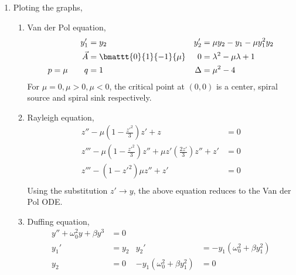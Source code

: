 \begin{enumerate}
    \item Ploting the graphs,
          \begin{enumerate}
              \item Van der Pol equation,
                    \begin{align}
                        y_1'             & = y_2                             &
                        y_2'             & = \mu y_2 - y_1  -\mu y_1^{2} y_2   \\
                        \vec{A}          & = \bmattt{0}{1}{-1}{\mu}          &
                        0                & = \lambda^{2} - \mu\lambda + 1      \\
                        p = \mu \qquad q & = 1                               &
                        \Delta           & = \mu^{2} - 4
                    \end{align}
                    For $ \mu = 0, \mu > 0, \mu< 0 $, the critical point at $ (0, 0) $
                    is a center, spiral source and spiral sink respectively.
              \item Rayleigh equation,
                    \begin{align}
                        z'' - \mu \left( 1 - \frac{z'^{2}}{3} \right) z' + z & = 0 \\
                        z''' - \mu\left( 1 - \frac{z'^2}{3} \right)z''
                        + \mu z' \left( \frac{2z'}{3} \right)z'' + z'        & = 0 \\
                        z''' - ( 1 - z'^2)\mu z''
                        + z'                                                 & = 0 \\
                    \end{align}
                    Using the substitution $ z' \to y $, the above equation
                    reduces to the Van der Pol ODE.
              \item Duffing equation,
                    \begin{align}
                        y'' + \omega_0^{2}y + \beta y^{3}  & = 0                   \\
                        y_1'                               & = y_2               &
                        y_2'                               & = -y_1(\omega_0^{2}
                        + \beta y_1^{2})                                           \\
                        y_2                                & = 0                 &
                        -y_1(\omega_0^{2} + \beta y_1^{2}) & = 0                   \\

\end{align}
\end{enumerate}
\end{enumerate}
